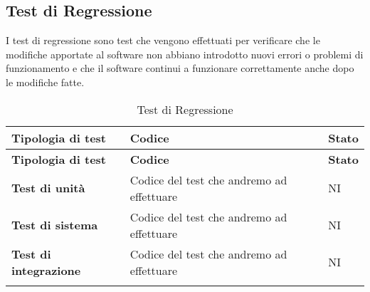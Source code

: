 \subsection{Test di Regressione}
I test di regressione sono test che vengono effettuati per verificare che le modifiche apportate al software non abbiano introdotto nuovi errori o problemi di funzionamento e che il software continui a funzionare correttamente anche dopo le modifiche fatte. \\
\begin{longtable}{|>{\raggedright\arraybackslash}m{}|>{\raggedright\arraybackslash}m{}|>{\raggedright\arraybackslash}m{}|}
	\hline
	\textbf{Tipologia di test}    & \textbf{Codice}                           & \textbf{Stato} \\
	\hline
	\endfirsthead
	\hline
	\textbf{Tipologia di test}    & \textbf{Codice}                           & \textbf{Stato} \\
	\endhead
	\textbf{Test di unità}        & Codice del test che andremo ad effettuare & NI             \\
	\hline
	\textbf{Test di sistema}      & Codice del test che andremo ad effettuare & NI             \\
	\hline
	\textbf{Test di integrazione} & Codice del test che andremo ad effettuare & NI             \\
	\hline
	\caption{Test di Regressione}
\end{longtable}
\newpage
